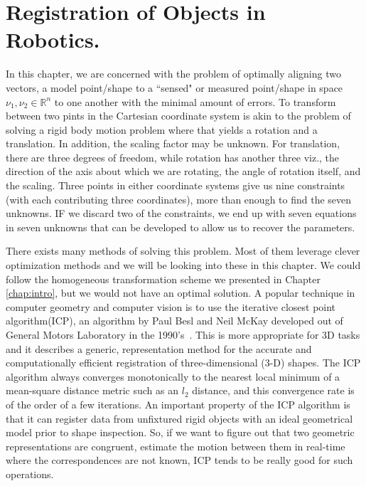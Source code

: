 \chapter{Registration of Objects in Robotics.}  
 \label{chap:opt_rot::intro}
 
 In this chapter, we are concerned with the problem of optimally aligning two vectors, a model point/shape to a ``sensed" or measured point/shape in space \eg $\nu_1, \nu_2 \in \mathbb{R}^n$ to one another with the minimal amount of errors.
 To transform between two pints in the Cartesian coordinate system is akin to the problem of solving a rigid body motion problem where that yields a rotation and a translation. In addition, the scaling factor may be unknown. For translation, there are three degrees of freedom, while rotation has another three viz., the direction of the axis about which we are rotating,  the angle of rotation itself, and the scaling. Three points in either coordinate systems
 give us nine constraints (with each contributing three coordinates), more than enough to find the seven unknowns. IF we discard two of the constraints, we end up with seven equations in seven unknowns that can be developed to allow us to recover the parameters.
 
 There exists many methods of solving this problem. Most of them leverage clever optimization methods and we will be looking into these in this chapter. We could follow the homogeneous transformation scheme we presented in Chapter \ref{chap:intro}, but we would not have an optimal solution. A popular technique in computer geometry and computer vision is to use the iterative closest point algorithm(ICP), an algorithm by Paul Besl and Neil McKay developed out of General Motors Laboratory in the 1990's~\cite{besl1992method}. This is more appropriate for 3D tasks and it describes a generic, representation method for the accurate and computationally efficient registration of three-dimensional (3-D) shapes. The ICP algorithm always converges monotonically to the nearest local minimum of a mean-square distance metric such as an $l_2$ distance, and this convergence rate is of the order of a few iterations. An important property of the ICP algorithm is that it can register data from unfixtured rigid objects with an ideal geometrical model prior to shape inspection. So, if we want to figure out that two geometric representations are congruent, estimate the motion between them in real-time where the correspondences are not known, ICP tends to be really good for such operations.
 
